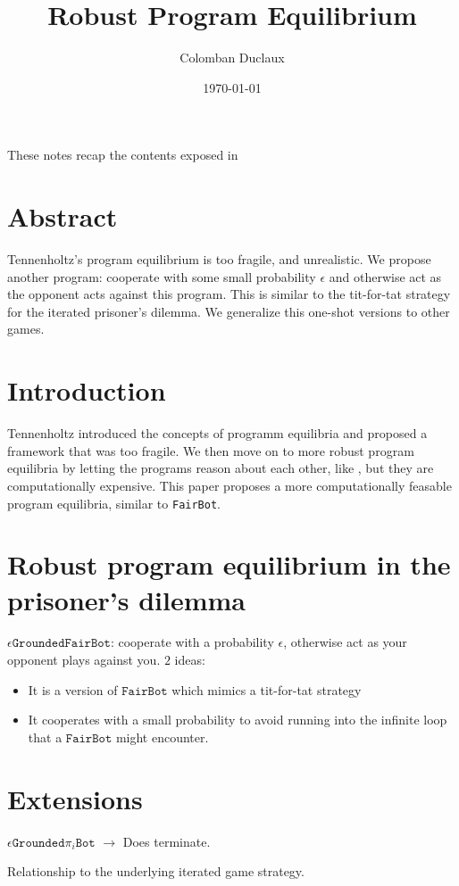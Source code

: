 \documentclass{article}
\title{Robust Program Equilibrium}
\author{Colomban Duclaux}
\date{\today}
\begin{document}
\maketitle

These notes recap the contents exposed in \cite{robust_program_equilibrium}
\section{Abstract}
Tennenholtz's program equilibrium is too fragile, and unrealistic. We propose another program:  cooperate with some small probability $\epsilon$ and otherwise act as the opponent
acts against this program. This is similar to the tit-for-tat strategy for the iterated prisoner's dilemma.
We generalize this one-shot versions to other games.

\section{Introduction}
Tennenholtz introduced the concepts of programm equilibria and proposed a framework that was too fragile.
We then move on to more robust program equilibria by letting the programs reason about each other, like \cite{critch2022cooperativeuncooperativeinstitutiondesigns}, but they are computationally expensive.
This paper proposes a more computationally feasable program equilibria, similar to \texttt{FairBot}.

\section{Robust program equilibrium in the prisoner's dilemma}
$\epsilon \texttt{GroundedFairBot}$: cooperate with a probability $\epsilon$, otherwise act as your opponent plays against you.
$2$ ideas: \begin{itemize}
    \item It is a version of $\texttt{FairBot}$ which mimics a tit-for-tat strategy
    \item It cooperates with a small probability to avoid running into the infinite loop that a $\texttt{FairBot}$ might encounter.
\end{itemize}

\section{Extensions}
$\epsilon \texttt{Grounded} \pi_i\texttt{Bot}$ $\to$ Does terminate.

Relationship to the underlying iterated game strategy.

\printbibliography
\end{document}
